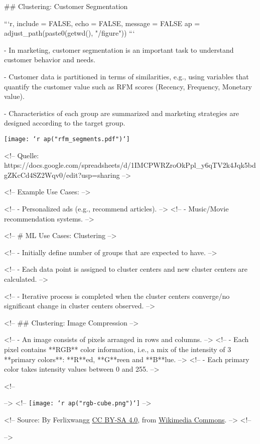 ## Clustering: Customer Segmentation

```{r, include = FALSE, echo = FALSE, message = FALSE}
ap = adjust_path(paste0(getwd(), "/figure"))
```

- In marketing, customer segmentation is an important task to understand customer behavior and needs.

- Customer data is partitioned in terms of similarities, e.g., using variables that quantify the customer value such as RFM scores (Recency, Frequency, Monetary value).

- Characteristics of each group are summarized and marketing strategies are designed according to the target group.

\begin{center}
\texttt{[image: `r ap("rfm\_segments.pdf")`]}
\end{center}

<!-- Quelle: https://docs.google.com/spreadsheets/d/1IMCPWRZroOkPpl_y6qTV2k4Jqk5bdgZKcCd4SZ2Wqv0/edit?usp=sharing -->

<!-- Example Use Cases: -->

<!-- - Personalized ads (e.g., recommend articles). -->
<!-- - Music/Movie recommendation systems. -->

<!-- # ML Use Cases: Clustering -->

<!-- - Initially define number of groups that are expected to have.  -->

<!-- - Each data point is assigned to cluster centers and new cluster centers are calculated. -->

<!-- - Iterative process is completed when the cluster centers converge/no significant change in cluster centers observed.  -->


<!-- ## Clustering: Image Compression -->

<!-- - An image consists of pixels arranged in rows and columns. -->
<!-- - Each pixel contains **RGB** color information, i.e., a mix of the intensity of 3 **primary colors**: **R**ed, **G**reen and **B**lue. -->
<!-- - Each primary color takes intensity values between 0 and 255. -->

<!-- \begin{center} -->
<!-- \texttt{[image: `r ap("rgb-cube.png")`]} -->

<!-- \tiny Source: By Ferlixwangg \href{https://creativecommons.org/licenses/by-sa/4.0}{CC BY-SA 4.0}, from \href{https://commons.wikimedia.org/wiki/File:Rgb-cube.gif}{Wikimedia Commons}. -->
<!-- \end{center} -->


